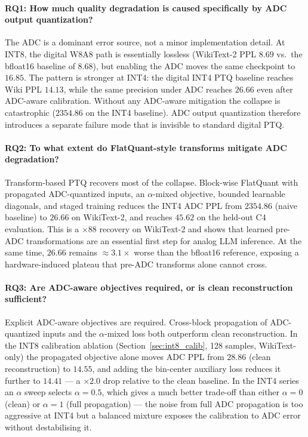 \documentclass[a4paper,11pt,oneside]{article}
\theoremstyle{breakstyle}
\begin{document}
  \paragraph{RQ1: How much quality degradation is caused specifically by ADC output quantization?}

  The ADC is a dominant error source, not a minor implementation
  detail.  At INT8, the digital W8A8 path is essentially lossless
  (WikiText-2 PPL $8.69$ vs.\ the bfloat16 baseline of $8.68$), but
  enabling the ADC moves the same checkpoint to $16.85$.  The pattern
  is stronger at INT4: the digital INT4 PTQ baseline reaches Wiki PPL
  $14.13$, while the same precision under ADC reaches $26.66$ even
  after ADC-aware calibration.  Without any ADC-aware mitigation the
  collapse is catastrophic ($2354.86$ on the INT4 baseline).  ADC
  output quantization therefore introduces a separate failure mode
  that is invisible to standard digital PTQ.

  \paragraph{RQ2: To what extent do FlatQuant-style transforms mitigate ADC degradation?}

  Transform-based PTQ recovers most of the collapse.  Block-wise
  FlatQuant with propagated ADC-quantized inputs, an
  $\alpha$-mixed objective, bounded learnable diagonals, and staged
  training reduces the INT4 ADC PPL from $2354.86$ (naive baseline)
  to $26.66$ on WikiText-2, and reaches $45.62$ on the held-out C4
  evaluation.  This is a $\times 88$ recovery on WikiText-2 and shows
  that learned pre-ADC transformations are an essential first step
  for analog LLM inference.  At the same time, $26.66$ remains $\approx 3.1\times$
  worse than the bfloat16 reference, exposing a hardware-induced
  plateau that pre-ADC transforms alone cannot cross.

  \paragraph{RQ3: Are ADC-aware objectives required, or is clean reconstruction sufficient?}

  Explicit ADC-aware objectives are required.  Cross-block propagation
  of ADC-quantized inputs and the $\alpha$-mixed loss both outperform
  clean reconstruction.  In the INT8 calibration ablation
  (Section~\ref{sec:int8_calib}, 128 samples, WikiText-only) the
  propagated objective alone moves ADC PPL from $28.86$ (clean
  reconstruction) to $14.55$, and adding the bin-center auxiliary loss
  reduces it further to $14.41$ --- a $\times 2.0$ drop relative to
  the clean baseline.  In the INT4 series an $\alpha$ sweep selects
  $\alpha = 0.5$, which gives a much better trade-off than either
  $\alpha = 0$ (clean) or $\alpha = 1$ (full propagation) --- the noise
  from full ADC propagation is too aggressive at INT4 but a balanced
  mixture exposes the calibration to ADC error without destabilising
  it.
\end{document}
